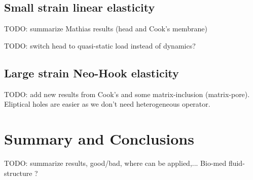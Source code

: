 \documentclass[preprint,12pt,times]{elsarticle}
\begin{document}
\subsection{Small strain linear elasticity}

TODO: summarize Mathias results (head and Cook's membrane)

TODO: switch head to quasi-static load instead of dynamics?

\subsection{Large strain Neo-Hook elasticity}

TODO: add new results from Cook's and some matrix-inclusion (matrix-pore).
Eliptical holes are easier as we don't need heterogeneous operator.

\section{Summary and Conclusions}

TODO: summarize results, good/bad, where can be applied,...
Bio-med fluid-structure ?



\end{document}
